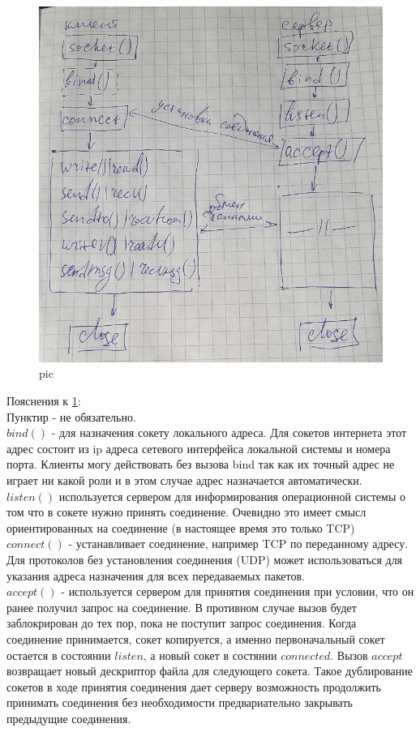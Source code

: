 \begin{figure}[H]
  \centering
  \includegraphics[width=\textwidth]{pic/2.png}
  \caption{pic}
  \label{pic_alhoritm_cs}
\end{figure}

Пояснения к \ref{pic_alhoritm_cs}:\\
Пунктир - не обязательно.\\
$bind()$ - для назначения сокету локального адреса. Для сокетов интернета этот адрес состоит из ip адреса сетевого интерфейса локальной системы и номера порта. Клиенты могу действовать без вызова bind так как их точный адрес не играет ни какой роли и в этом случае адрес назначается автоматически.\\
$listen()$ используется сервером для информирования операционной системы о том что в сокете нужно принять соединение. Очевидно это имеет смысл ориентированных на соединение (в настоящее время это только TCP)\\
$connect()$ - устанавливает соединение, например TCP по переданному адресу. Для протоколов без установления соединения (UDP) может использоваться для указания адреса назначения для всех передаваемых пакетов.\\
$accept()$ - используется сервером для принятия соединения при условии, что он ранее получил запрос на соединение. В противном случае вызов будет заблокрирован до тех пор, пока не поступит запрос соединения. Когда соединение принимается, сокет копируется, а именно первоначальный сокет остается в состоянии $listen$, а новый сокет в состянии $connected$.  Вызов $accept$ возвращает новый дескриптор файла для следующего сокета. Такое дублирование сокетов в ходе принятия соединения дает серверу возможность продолжить принимать соединения без необходимости предвариательно закрывать предыдущие соединения.

